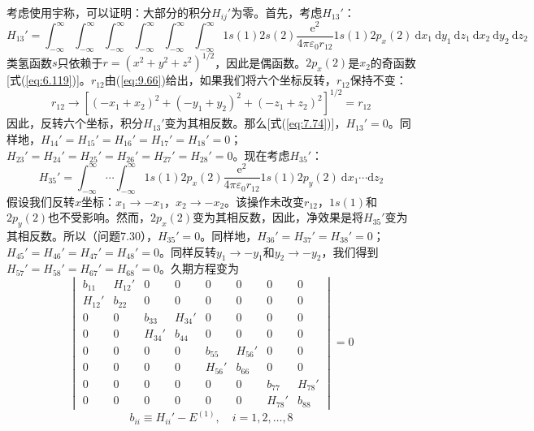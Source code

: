     考虑使用宇称，可以证明：大部分的积分$H_{ij}'$为零。首先，考虑$H_{13}'$：
    \begin{equation*}
        H_{13}' = \int_{-\infty}^{\infty} \int_{-\infty}^{\infty} \int_{-\infty}^{\infty} \int_{-\infty}^{\infty} \int_{-\infty}^{\infty} \int_{-\infty}^{\infty} 1s\left(1\right)2s\left(2\right)\frac{\mathrm{e}^2}{4\pi\varepsilon_0r_{12}}1s\left(1\right)2p_x\left(2\right)\:\mathrm{d}x_1\:\mathrm{d}y_1\:\mathrm{d}z_1\:\mathrm{d}x_2\:\mathrm{d}y_2\:\mathrm{d}z_2
    \end{equation*}
    类氢函数$s$只依赖于$r = \left(x^2+y^2+z^2\right)^{1/2}$，因此是偶函数。$2p_x\left(2\right)$是$x_2$的奇函数[式(\ref{eq:6.119})]。$r_{12}$由(\ref{eq:9.66})给出，如果我们将六个坐标反转，$r_{12}$保持不变：
    \begin{equation*}
        r_{12} \to \left[\left(-x_1+x_2\right)^2 + \left(-y_1+y_2\right)^2 + \left(-z_1+z_2\right)^2\right]^{1/2} = r_{12}
    \end{equation*}
    因此，反转六个坐标，积分$H_{13}'$变为其相反数。那么[式(\ref{eq:7.74})]，$H_{13}' = 0$。同样地，$H_{14}' = H_{15}' = H_{16}' = H_{17}' = H_{18}' = 0$；$H_{23}' = H_{24}' = H_{25}' = H_{26}' = H_{27}' = H_{28}' = 0$。现在考虑$H_{35}'$：
    \begin{equation*}
        H_{35}' = \int_{-\infty}^{\infty} \cdots \int_{-\infty}^{\infty} 1s\left(1\right)2p_x\left(2\right)\frac{\mathrm{e}^2}{4\pi\varepsilon_0r_{12}}1s\left(1\right)2p_y\left(2\right)\:\mathrm{d}x_1\cdots\mathrm{d}z_2
    \end{equation*}
    假设我们反转$x$坐标：$x_1 \to -x_1$，$x_2 \to -x_2$。该操作未改变$r_{12}$，$1s\left(1\right)$和$2p_y\left(2\right)$也不受影响。然而，$2p_x\left(2\right)$变为其相反数，因此，净效果是将$H_{35}'$变为其相反数。所以（问题7.30），$H_{35}' = 0$。同样地，$H_{36}' = H_{37}' = H_{38}' = 0$；$H_{45}' = H_{46}' = H_{47}' = H_{48}' = 0$。同样反转$y_1 \to -y_1$和$y_2 \to -y_2$，我们得到$H_{57}' = H_{58}' = H_{67}' = H_{68}' = 0$。久期方程变为
    \begin{equation*}
        \begin{vmatrix}
            b_{11} & H_{12}' & 0 & 0 & 0 & 0 & 0 & 0 \\
            H_{12}' & b_{22} & 0 & 0 & 0 & 0 & 0 & 0 \\
            0 & 0 & b_{33} & H_{34}' & 0 & 0 & 0 & 0 \\
            0 & 0 & H_{34}' & b_{44} & 0 & 0 & 0 & 0 \\
            0 & 0 & 0 & 0 & b_{55} & H_{56}' & 0 & 0 \\
            0 & 0 & 0 & 0 & H_{56}' & b_{66} & 0 & 0 \\
            0 & 0 & 0 & 0 & 0 & 0 & b_{77} & H_{78}' \\
            0 & 0 & 0 & 0 & 0 & 0 & H_{78}' & b_{88}
        \end{vmatrix} = 0
    \end{equation*}
    \begin{equation*}
        b_{ii} \equiv H_{ii}' - E^{\left(1\right)}, \quad i = 1,2,\ldots,8
    \end{equation*}


